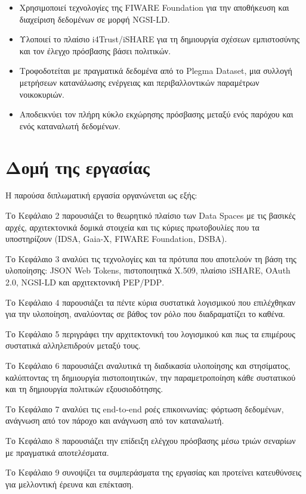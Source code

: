 \begin{itemize}
    \item Χρησιμοποιεί τεχνολογίες της \textlatin{FIWARE Foundation} για
    την αποθήκευση και διαχείριση δεδομένων σε μορφή \textlatin{NGSI-LD}.
    \item Υλοποιεί το πλαίσιο \textlatin{i4Trust}/\textlatin{iSHARE} για
    τη δημιουργία σχέσεων εμπιστοσύνης και τον έλεγχο πρόσβασης βάσει
    πολιτικών.
    \item Τροφοδοτείται με πραγματικά δεδομένα από το \textlatin{Plegma Dataset}, μια συλλογή μετρήσεων κατανάλωσης ενέργειας
    και περιβαλλοντικών παραμέτρων νοικοκυριών.
    \item Αποδεικνύει τον πλήρη κύκλο εκχώρησης πρόσβασης μεταξύ ενός παρόχου και ενός καταναλωτή
    δεδομένων.
\end{itemize}

\section{Δομή της εργασίας}
\label{sec:structure}

Η παρούσα διπλωματική εργασία οργανώνεται ως εξής:

Το Κεφάλαιο 2 παρουσιάζει το θεωρητικό πλαίσιο των \textlatin{Data
Spaces} με τις βασικές αρχές, αρχιτεκτονικά δομικά στοιχεία και τις κύριες
πρωτοβουλίες που τα υποστηρίζουν (\textlatin{IDSA}, \textlatin{Gaia-X},
\textlatin{FIWARE Foundation}, \textlatin{DSBA}).

Το Κεφάλαιο 3 αναλύει τις τεχνολογίες και τα πρότυπα που αποτελούν τη
βάση της υλοποίησης: \textlatin{JSON Web Tokens}, πιστοποιητικά
\textlatin{X.509}, πλαίσιο \textlatin{iSHARE}, \textlatin{OAuth 2.0},
\textlatin{NGSI-LD} και αρχιτεκτονική \textlatin{PEP/PDP}.

Το Κεφάλαιο 4 παρουσιάζει τα πέντε κύρια συστατικά λογισμικού που
επιλέχθηκαν για την υλοποίηση, αναλύοντας σε βάθος τον ρόλο που διαδραματίζει το καθένα.

Το Κεφάλαιο 5 περιγράφει την αρχιτεκτονική του λογισμικού και πως τα επιμέρους συστατικά αλληλεπιδρούν μεταξύ τους. 

Το Κεφάλαιο 6 παρουσιάζει αναλυτικά τη διαδικασία υλοποίησης και
στησίματος, καλύπτοντας τη δημιουργία πιστοποιητικών, την παραμετροποίηση
κάθε συστατικού και τη δημιουργία πολιτικών εξουσιοδότησης.

Το Κεφάλαιο 7 αναλύει τις \textlatin{end-to-end} ροές επικοινωνίας:
φόρτωση δεδομένων, ανάγνωση από τον πάροχο και ανάγνωση από τον καταναλωτή.

Το Κεφάλαιο 8 παρουσιάζει την επίδειξη ελέγχου πρόσβασης μέσω τριών
σεναρίων με πραγματικά αποτελέσματα.

Το Κεφάλαιο 9 συνοψίζει τα συμπεράσματα της εργασίας και προτείνει
κατευθύνσεις για μελλοντική έρευνα και επέκταση.
